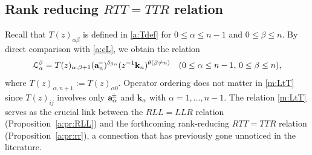\documentclass[11pt]{article}
\theoremstyle{definition}
\numberwithin{equation}{section}
\newcommand{\am}{{\rm\aaa}^{\!-} }
\newcommand{\apm}{{\rm\aaa}^{\!\pm} }
\newcommand{\aaa}{\mathbf{a}}
\newcommand{\kk}{\mathbf{k}}
\begin{document}
\subsection{Rank reducing \texorpdfstring{$RTT=TTR$}{RTT=TTR} relation}
Recall that \( T(z)_{\alpha \beta} \) is defined in \eqref{a:Tdef}
 for \( 0 \leq \alpha \leq n-1 \) and \( 0 \leq \beta \leq n \).
%
By direct comparison with \eqref{a:cL}, we obtain the relation
\begin{equation} \label{m:LtT}
\mathcal{L}_\alpha^\beta = 
T(z)_{\alpha,\beta+1} 
(\am_n)^{\delta_{\beta n}} (z^{-1}\kk_n)^{\theta(\beta \neq n)}
\quad (0 \leq \alpha \leq n-1, \, 0 \leq \beta \leq n),
\end{equation}
where \( T(z)_{\alpha, n+1} := T(z)_{\alpha 0} \).
Operator ordering does not matter in \eqref{m:LtT} 
since \( T(z)_{ij} \) involves only \( \apm_\alpha \) and \( \kk_\alpha \) 
with \( \alpha = 1, \ldots, n-1 \).
%
The relation \eqref{m:LtT} serves as the crucial link between the $RLL=LLR$ relation (Proposition~\ref{a:pr:RLL}) 
and the forthcoming rank-reducing $RTT=TTR$ relation (Proposition~\ref{a:pr:rr}), 
a connection that has previously gone unnoticed in the literature.
%
\end{document}
